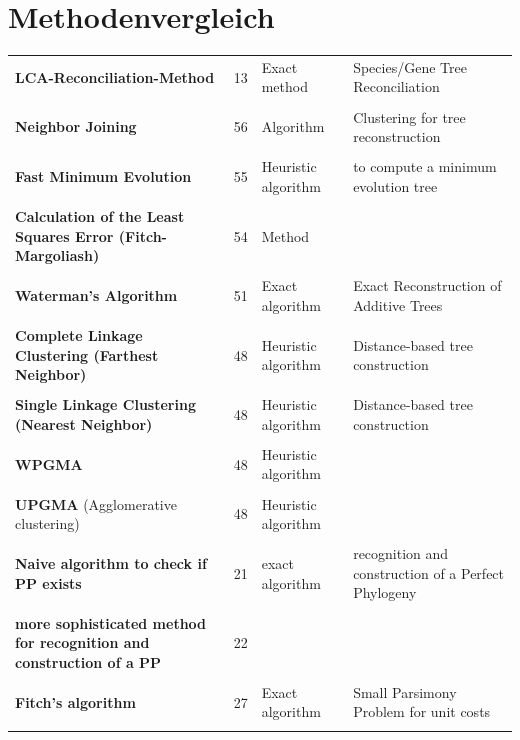 \section{Methodenvergleich}
\begin{table}[H]
 \centering
    \begin{tabular}{p{4cm}p{1cm}p{3cm}p{6cm}}  
        \textbf{LCA-Reconciliation-Method} & 13 & Exact method & Species/Gene Tree Reconciliation \\ \\
        \textbf{Neighbor Joining} & 56 & Algorithm & Clustering for tree reconstruction \\ \\
        \textbf{Fast Minimum Evolution} & 55 & Heuristic algorithm & to compute a minimum evolution tree  \\ \\
        \textbf{Calculation of the Least Squares Error (Fitch-Margoliash)}& 54 & Method &  \\ \\
        \textbf{Waterman's Algorithm} & 51 & Exact algorithm & Exact Reconstruction of Additive Trees \\ \\
        \textbf{Complete Linkage Clustering (Farthest Neighbor)} & 48& Heuristic algorithm &\textcolor{amethyst}{Distance-based} tree construction \\ \\
        \textbf{Single Linkage Clustering (Nearest Neighbor)}& 48 & Heuristic algorithm &\textcolor{amethyst}{Distance-based} tree construction\\  \\
        \textbf{WPGMA} & 48 & Heuristic algorithm & \\ \\
        \textbf{UPGMA} (Agglomerative clustering)& 48 & Heuristic algorithm \\ \\
        \textbf{Naive algorithm to check if PP exists} & 21 & exact algorithm & recognition and construction of a Perfect Phylogeny\\ \\
       \textbf{ more sophisticated method for recognition and construction of a PP }& 22 \\ \\
        \textbf{Fitch’s algorithm} 
        &27
        & Exact algorithm
        & Small Parsimony Problem for unit costs
        \\ \\

\end{tabular}
\end{table}

